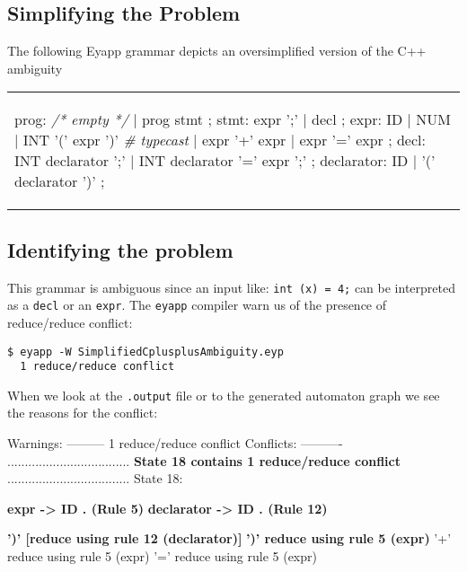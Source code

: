\subsection{Simplifying the Problem}

The following Eyapp grammar 
depicts an oversimplified version of the C++ ambiguity 

\begin{center}
\begin{tabular}{p{8.5cm}}
\begin{VERBATIM}
prog: \textit{/* empty */}         | prog stmt ;
stmt: expr ';'            | decl      ;
expr: ID                  | NUM 
    | INT '(' expr ')'    \textit{# typecast} 
    | expr '+' expr       | expr '=' expr 
;
decl: INT declarator ';'  
    | INT declarator '=' expr ';' 
;
declarator: ID            | '(' declarator ')' ;
\end{VERBATIM}
\end{tabular}
\end{center}


\subsection{Identifying the problem}

This grammar is ambiguous since an input like: \verb|int (x) = 4;|
can be interpreted as a \texttt{decl} or an \texttt{expr}.
The \texttt{eyapp} compiler warn us of the presence of reduce/reduce conflict:

\begin{verbatim}
$ eyapp -W SimplifiedCplusplusAmbiguity.eyp
  1 reduce/reduce conflict
\end{verbatim}


When we look at the \texttt{.output} file  or to the generated automaton graph
we see the reasons for the conflict:

\begin{VERBATIM}
Warnings:
---------
1 reduce/reduce conflict
Conflicts:
----------
................................... 
\textbf{State 18 contains 1 reduce/reduce conflict}
................................... 
State 18:

    \textbf{expr -> ID .    (Rule 5)}
    \textbf{declarator -> ID .  (Rule 12)}

    \textbf{')' [reduce using rule 12 (declarator)]}
    \textbf{')' reduce using rule 5 (expr)}
    '+' reduce using rule 5 (expr)
    '=' reduce using rule 5 (expr)
\end{VERBATIM}


